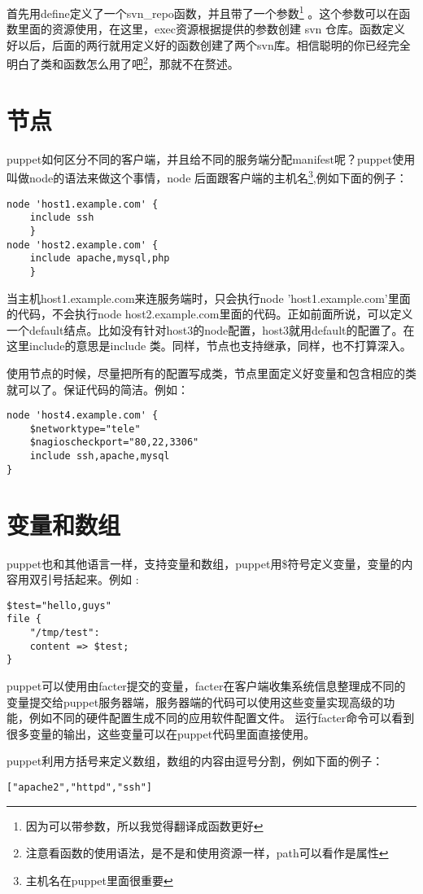 首先用define定义了一个svn\_repo函数，并且带了一个参数\footnote{\fsong\tiny  因为可以带参数，所以我觉得翻译成函数更好} 。这个参数可以在函数里面的资源使用，在这里，exec资源根据提供的参数创建 svn 仓库。函数定义好以后，后面的两行就用定义好的函数创建了两个svn库。相信聪明的你已经完全明白了类和函数怎么用了吧\footnote{\fsong\tiny 注意看函数的使用语法，是不是和使用资源一样，path可以看作是属性}，那就不在赘述。


\par
\section{\msyh 节点}
puppet如何区分不同的客户端，并且给不同的服务端分配manifest呢？puppet使用叫做node的语法来做这个事情，node 后面跟客户端的主机名\footnote{\fsong\tiny 主机名在puppet里面很重要},例如下面的例子：
\msyh \begin{lstlisting}
node 'host1.example.com' {
	include ssh
	}
node 'host2.example.com' {
	include apache,mysql,php
	}
\end{lstlisting} \song

当主机host1.example.com来连服务端时，只会执行node 'host1.example.com'里面的代码，不会执行node host2.example.com里面的代码。正如前面所说，可以定义一个default结点。比如没有针对host3的node配置，host3就用default的配置了。在这里include的意思是include 类。同样，节点也支持继承，同样，也不打算深入。\par
使用节点的时候，尽量把所有的配置写成类，节点里面定义好变量和包含相应的类就可以了。保证代码的简洁。例如：
\msyh \begin{lstlisting}
node 'host4.example.com' {
	$networktype="tele"
	$nagioscheckport="80,22,3306"
	include ssh,apache,mysql
}
\end{lstlisting} \song

\section{\msyh 变量和数组 }

puppet也和其他语言一样，支持变量和数组，puppet用\$符号定义变量，变量的内容用双引号括起来。例如 :
\msyh \begin{lstlisting}
$test="hello,guys"
file {
	"/tmp/test":
	content => $test;
}
\end{lstlisting} \song

puppet可以使用由facter提交的变量，facter在客户端收集系统信息整理成不同的变量提交给puppet服务器端，服务器端的代码可以使用这些变量实现高级的功能，例如不同的硬件配置生成不同的应用软件配置文件。 运行facter命令可以看到很多变量的输出，这些变量可以在puppet代码里面直接使用。\par
puppet利用方括号来定义数组，数组的内容由逗号分割，例如下面的例子：
\msyh \begin{lstlisting}
["apache2","httpd","ssh"]
\end{lstlisting} \song

